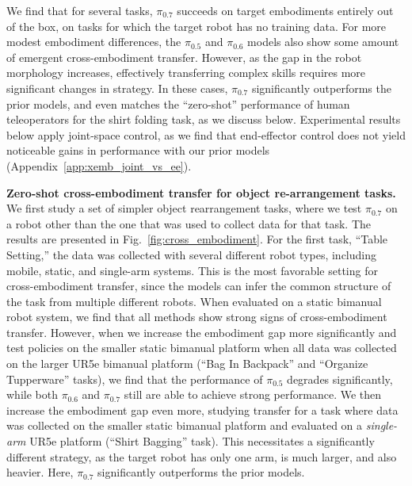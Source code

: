 \documentclass[conference]{IEEEtran}
\def \Pizf {$\pi_{0.5}$}
\def \Pizs {$\pi_{0.6}$}
\def \MethodName {$\pi_{0.7}$}
\begin{document}
We find that for several tasks, \MethodName{} succeeds on target embodiments entirely out of the box, on tasks for which the target robot has no training data. For more modest embodiment differences, the \Pizf{} and \Pizs{} models also show some amount of emergent cross-embodiment transfer. However, as the gap in the robot morphology increases, effectively transferring complex skills requires more significant changes in strategy. In these cases, \MethodName{} significantly outperforms the prior models, and even matches the ``zero-shot'' performance of human teleoperators for the shirt folding task, as we discuss below. Experimental results below apply joint-space control, as we find that end-effector control does not yield noticeable gains in performance with our prior models (Appendix~\ref{app:xemb_joint_vs_ee}).


\noindent \textbf{Zero-shot cross-embodiment transfer for object re-arrangement tasks. }
We first study a set of simpler object rearrangement tasks, where we test \MethodName{} on a robot other than the one that was used to collect data for that task. The results are presented in Fig.~\ref{fig:cross_embodiment}. For the first task, ``Table Setting,'' the data was collected with several different robot types, including mobile, static, and single-arm systems. This is the most favorable setting for cross-embodiment transfer, since the models can infer the common structure of the task from multiple different robots. When evaluated on a static bimanual robot system, we find that all methods show strong signs of cross-embodiment transfer. However, when we increase the embodiment gap more significantly and test policies on the smaller static bimanual platform when all data was collected on the larger UR5e bimanual platform (``Bag In Backpack'' and ``Organize Tupperware'' tasks), we find that the performance of \Pizf{} degrades significantly, while both \Pizs{} and \MethodName{} still are able to achieve strong performance. We then increase the embodiment gap even more, studying transfer for a task where data was collected on the smaller static bimanual platform and evaluated on a \emph{single-arm} UR5e platform (``Shirt Bagging'' task). This necessitates a significantly different strategy, as the target robot has only one arm, is much larger, and also heavier. Here, \MethodName{} significantly outperforms the prior models.
\end{document}
